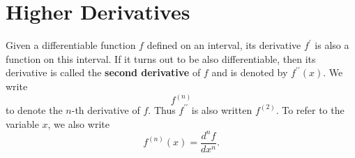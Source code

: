 \section*{Higher Derivatives}

Given a differentiable function $f$ defined on an interval, its derivative $f^\prime$ is also a function on this
interval. If it turns out to be also differentiable, then its derivative is called the \textbf{second derivative}
of $f$ and is denoted by $f^{\prime\prime}(x)$. We write
\[f^{(n)}\]
to denote the $n$-th derivative of $f$. Thus $f^{\prime\prime}$ is also written $f^{(2)}$. To refer to the variable
$x$, we also write
\[f^{(n)}(x) = \frac{d^nf}{dx^n}.\]
